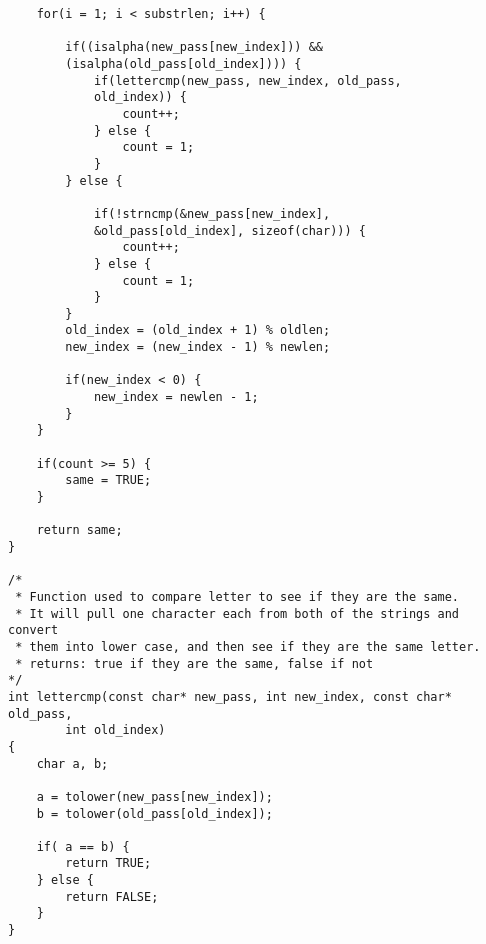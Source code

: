 \documentclass[12pt,letterpaper]{article}
\begin{document}
\begin{lstlisting}
	for(i = 1; i < substrlen; i++) {

		if((isalpha(new_pass[new_index])) &&
		(isalpha(old_pass[old_index]))) {
			if(lettercmp(new_pass, new_index, old_pass,
			old_index)) {
				count++;
			} else {
				count = 1;
			}
		} else {

			if(!strncmp(&new_pass[new_index],
			&old_pass[old_index], sizeof(char))) {
				count++;
			} else {
				count = 1;
			}
		}
		old_index = (old_index + 1) % oldlen;
		new_index = (new_index - 1) % newlen;

		if(new_index < 0) {
			new_index = newlen - 1;
		}
	}

	if(count >= 5) {
		same = TRUE;
	}
	
	return same;
}

/*
 * Function used to compare letter to see if they are the same.
 * It will pull one character each from both of the strings and convert
 * them into lower case, and then see if they are the same letter.
 * returns: true if they are the same, false if not
*/
int lettercmp(const char* new_pass, int new_index, const char* old_pass,
		int old_index)
{
	char a, b;

	a = tolower(new_pass[new_index]);
	b = tolower(old_pass[old_index]);

	if( a == b) {
		return TRUE;
	} else {
		return FALSE;
	}
}

\end{lstlisting}
\end{document}
